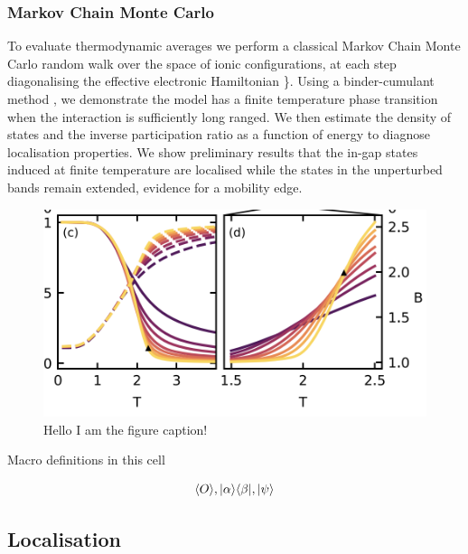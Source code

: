 \hypertarget{markov-chain-monte-carlo}{%
\subsubsection{Markov Chain Monte Carlo}\label{markov-chain-monte-carlo}}

To evaluate thermodynamic averages we perform a classical Markov Chain Monte Carlo random walk over the space of ionic configurations, at each step diagonalising the effective electronic Hamiltonian \textcite{maskaThermodynamicsTwodimensionalFalicovKimball2006}\}. Using a binder-cumulant method \autocite{binderFiniteSizeScaling1981,musialMonteCarloSimulations2002}, we demonstrate the model has a finite temperature phase transition when the interaction is sufficiently long ranged. We then estimate the density of states and the inverse participation ratio as a function of energy to diagnose localisation properties. We show preliminary results that the in-gap states induced at finite temperature are localised while the states in the unperturbed bands remain extended, evidence for a mobility edge.

\begin{figure}
\hypertarget{fig:binder}{%
\centering
\includegraphics[width=1\textwidth,height=\textheight]{figure_code/fk_chapter/binder.png}
\caption{Hello I am the figure caption!}\label{fig:binder}
}
\end{figure}

Macro definitions in this cell \[
\newcommand{\expval}[1]{\langle #1 \rangle}
\newcommand{\ket}[1]{|#1\rangle}
\newcommand{\bra}[1]{\langle#1|}
\newcommand{\op}[2]{|#1\rangle \langle#2|}
\]

\[
\expval{O}, \op{\alpha}{\beta}, \ket{\psi}
\]

\hypertarget{localisation-1}{%
\subsection{Localisation}\label{localisation-1}}

